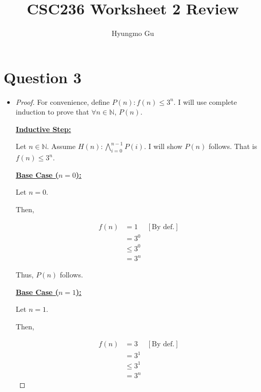 \documentclass[12pt]{article}
\begin{document}
\title{CSC236 Worksheet 2 Review}
\author{Hyungmo Gu}
\maketitle

\section*{Question 3}

\begin{itemize}
    \item

    \begin{proof}
        For convenience, define $P(n): f(n) \leq 3^n$. I will use complete induction to
        prove that $\forall n \in \mathbb{N}$, $P(n)$.

        \bigskip

        \underline{\textbf{Inductive Step:}}

        \bigskip

        Let $n \in \mathbb{N}$. Assume $H(n): \bigwedge_{i=0}^{n-1} P(i)$. I will
        show $P(n)$ follows. That is $f(n) \leq 3^n$.

        \bigskip

        \underline{\textbf{Base Case ($n = 0$):}}

        \bigskip

        Let $n = 0$.

        \bigskip

        Then,

        \begin{align}
            f(n) &= 1 & [\text{By def.}]\\
            &= 3^0\\
            &\leq 3^0\\
            &= 3^n
        \end{align}

        \bigskip

        Thus, $P(n)$ follows.

        \bigskip

        \underline{\textbf{Base Case ($n = 1$):}}

        \bigskip

        Let $n = 1$.

        \bigskip

        Then,

        \begin{align}
            f(n) &= 3 & [\text{By def.}]\\
            &= 3^1\\
            &\leq 3^1\\
            &= 3^n
        \end{align}


\end{proof}
\end{itemize}
\end{document}
